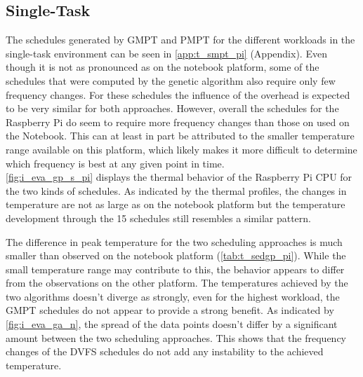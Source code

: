 \subsection{Single-Task}
The schedules generated by GMPT and PMPT for the different workloads in the single-task environment can be seen in \autoref{app:t_smpt_pi} (Appendix). Even though it is not as pronounced as on the notebook platform, some of the schedules that were computed by the genetic algorithm also require only few frequency changes. For these schedules the influence of the overhead is expected to be very similar for both approaches. However, overall the schedules for the Raspberry Pi do seem to require more frequency changes than those on used on the Notebook. This can at least in part be attributed to the smaller temperature range available on this platform, which likely makes it more difficult to determine which frequency is best at any given point in time.\\

\autoref{fig:i_eva_gp_s_pi} displays the thermal behavior of the Raspberry Pi CPU for the two kinds of schedules. As indicated by the thermal profiles, the changes in temperature are not as large as on the notebook platform but the temperature development through the 15 schedules still resembles a similar pattern.\\
\begin{table}[H]
 \centering
 \caption[Single-Task median results Raspberry]{Median peak temperature for all workloads and their performance gap}\label{tab:t_sedgp_pi}
 \setlength\tabcolsep{5pt}
\end{table}
The difference in peak temperature for the two scheduling approaches is much smaller than observed on the notebook platform (\autoref{tab:t_sedgp_pi}). While the small temperature range may contribute to this, the behavior appears to differ from the observations on the other platform. The temperatures achieved by the two algorithms doesn't diverge as strongly, even for the highest workload, the GMPT schedules do not appear to provide a strong benefit. As indicated by \autoref{fig:i_eva_ga_n}, the spread of the data points doesn't differ by a significant amount between the two scheduling approaches. This shows that the frequency changes of the DVFS schedules do not add any instability to the achieved temperature.\\
